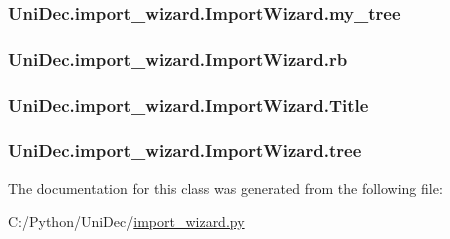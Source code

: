 \subsubsection[{my\+\_\+tree}]{\setlength{\rightskip}{0pt plus 5cm}Uni\+Dec.\+import\+\_\+wizard.\+Import\+Wizard.\+my\+\_\+tree}\label{class_uni_dec_1_1import__wizard_1_1_import_wizard_aae466a0fb247c1a44c0f85abf915eece}
\hypertarget{class_uni_dec_1_1import__wizard_1_1_import_wizard_a51d03ee9121729f4bc261eabe54a2c61}{}
\subsubsection[{rb}]{\setlength{\rightskip}{0pt plus 5cm}Uni\+Dec.\+import\+\_\+wizard.\+Import\+Wizard.\+rb}\label{class_uni_dec_1_1import__wizard_1_1_import_wizard_a51d03ee9121729f4bc261eabe54a2c61}
\hypertarget{class_uni_dec_1_1import__wizard_1_1_import_wizard_a4c081307751880a85239fe21b7ef539d}{}
\subsubsection[{Title}]{\setlength{\rightskip}{0pt plus 5cm}Uni\+Dec.\+import\+\_\+wizard.\+Import\+Wizard.\+Title}\label{class_uni_dec_1_1import__wizard_1_1_import_wizard_a4c081307751880a85239fe21b7ef539d}
\hypertarget{class_uni_dec_1_1import__wizard_1_1_import_wizard_ae8a57d4c610cdc11fdac2719eb63e0c1}{}
\subsubsection[{tree}]{\setlength{\rightskip}{0pt plus 5cm}Uni\+Dec.\+import\+\_\+wizard.\+Import\+Wizard.\+tree}\label{class_uni_dec_1_1import__wizard_1_1_import_wizard_ae8a57d4c610cdc11fdac2719eb63e0c1}


The documentation for this class was generated from the following file\+:\begin{DoxyCompactItemize}
\item 
C\+:/\+Python/\+Uni\+Dec/\hyperlink{import__wizard_8py}{import\+\_\+wizard.\+py}\end{DoxyCompactItemize}

